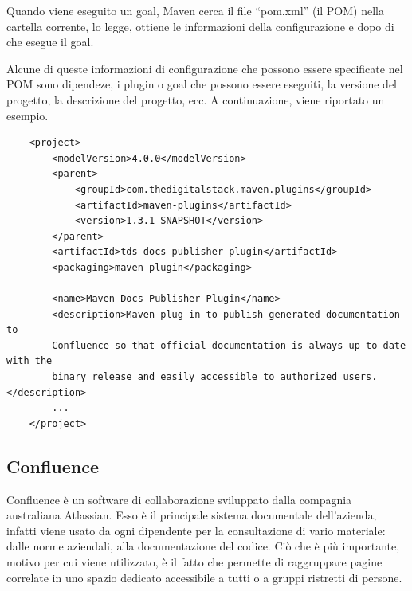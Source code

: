     Quando viene eseguito un goal, Maven cerca il file ``pom.xml'' (il POM) nella cartella corrente, lo legge, ottiene le informazioni della configurazione e dopo di che esegue il goal.

    Alcune di queste informazioni di configurazione che possono essere specificate nel POM sono dipendeze, i plugin o goal che possono essere eseguiti, la versione del progetto, la descrizione del progetto, ecc.
    A continuazione, viene riportato un esempio.


    \begin{lstlisting} 
    <project>
        <modelVersion>4.0.0</modelVersion>
        <parent>
            <groupId>com.thedigitalstack.maven.plugins</groupId>
            <artifactId>maven-plugins</artifactId>
            <version>1.3.1-SNAPSHOT</version>
        </parent>
        <artifactId>tds-docs-publisher-plugin</artifactId>
        <packaging>maven-plugin</packaging>

        <name>Maven Docs Publisher Plugin</name>
        <description>Maven plug-in to publish generated documentation to 
        Confluence so that official documentation is always up to date with the 
        binary release and easily accessible to authorized users.</description>
        ...
    </project>  
    \end{lstlisting}
    


    \subsection{Confluence}
    Confluence è un software di collaborazione sviluppato dalla compagnia australiana Atlassian.
    Esso è il principale sistema documentale dell'azienda, infatti viene usato da ogni dipendente per la consultazione di vario materiale: dalle norme aziendali, alla documentazione del codice.
    Ciò che è più importante, motivo per cui viene utilizzato, è il fatto che permette di raggruppare pagine correlate in uno spazio dedicato accessibile a tutti o a gruppi ristretti di persone.
    
